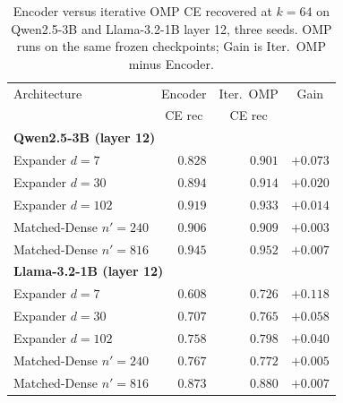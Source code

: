 \documentclass{article}
\theoremstyle{plain}
\theoremstyle{definition}
\theoremstyle{remark}
\begin{document}
\begin{table}[h]
    \centering
    \caption{Encoder versus iterative OMP CE recovered at $k{=}64$ on Qwen2.5-3B and Llama-3.2-1B layer 12, three seeds. OMP runs on the same frozen checkpoints; Gain is Iter.\ OMP minus Encoder.}
    \label{tab:omp_at_scale}
    \small
    \setlength{\tabcolsep}{5pt}
    \begin{tabular}{lrrr}
        \toprule
        Architecture & \multicolumn{1}{c}{Encoder} & \multicolumn{1}{c}{Iter.\ OMP} & \multicolumn{1}{c}{Gain} \\
             & \multicolumn{1}{c}{CE rec}  & \multicolumn{1}{c}{CE rec}     & \\
        \midrule
        \multicolumn{4}{l}{\textbf{Qwen2.5-3B (layer 12)}} \\
        Expander $d{=}7$          & $0.828$ & $\mathbf{0.901}$ & $\mathbf{+0.073}$ \\
        Expander $d{=}30$         & $0.894$ & $0.914$          & $+0.020$          \\
        Expander $d{=}102$        & $0.919$ & $0.933$          & $+0.014$          \\
        Matched-Dense $n'{=}240$  & $0.906$ & $0.909$          & $+0.003$          \\
        Matched-Dense $n'{=}816$  & $0.945$ & $0.952$          & $+0.007$          \\
        \midrule
        \multicolumn{4}{l}{\textbf{Llama-3.2-1B (layer 12)}} \\
        Expander $d{=}7$          & $0.608$ & $\mathbf{0.726}$ & $\mathbf{+0.118}$ \\
        Expander $d{=}30$         & $0.707$ & $0.765$          & $+0.058$          \\
        Expander $d{=}102$        & $0.758$ & $0.798$          & $+0.040$          \\
        Matched-Dense $n'{=}240$  & $0.767$ & $0.772$          & $+0.005$          \\
        Matched-Dense $n'{=}816$  & $0.873$ & $0.880$          & $+0.007$          \\
        \bottomrule
    \end{tabular}
\end{table}
\end{document}
